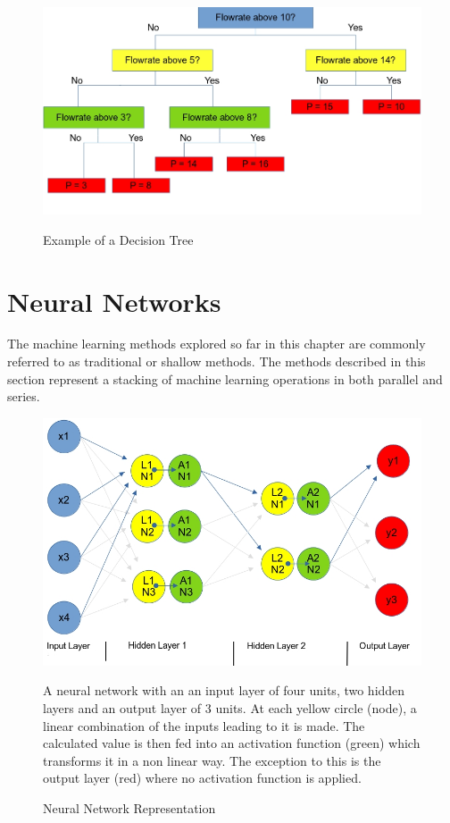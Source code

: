  \begin{figure}[h]
 	\centering
 	\includegraphics[scale=0.4]{Figures/DecisionTree.jpg}
 	\caption{Example of a Decision Tree} {}
 	\label{fig:DecisionTree}
 \end{figure}


\section{Neural Networks} \label{NN}

The machine learning methods explored so far in this chapter are commonly referred to as traditional or shallow methods.  The methods described in this section represent a stacking of machine learning operations in both parallel and series.  

\begin{figure}[p]
	\centering
	\includegraphics[scale=0.5]{Figures/NeuralNetwork.jpg}
	\caption{Neural Network Representation} {A neural network with an an input layer of four units, two hidden layers and an output layer of 3 units. At each yellow circle (node), a linear combination of the inputs leading to it is made. The calculated value is then fed into an activation function (green) which transforms it in a non linear way. The exception to this is the output layer (red) where no activation function is applied.}
	\label{fig:neural}
\end{figure}

